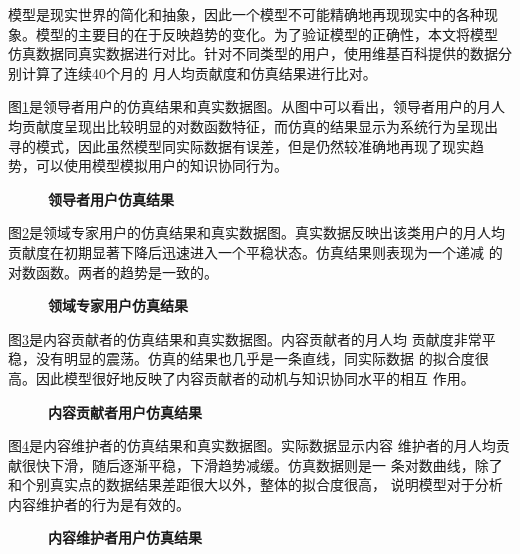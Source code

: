 模型是现实世界的简化和抽象，因此一个模型不可能精确地再现现实中的各种现
象。模型的主要目的在于反映趋势的变化。为了验证模型的正确性，本文将模型
仿真数据同真实数据进行对比。针对不同类型的用户，使用维基百科提供的数据分别计算了连续40个月的
月人均贡献度和仿真结果进行比对。

图\ref{fig:simu1}是领导者用户的仿真结果和真实数据图。从图中可以看出，领导者用户的月人
均贡献度呈现出比较明显的对数函数特征，而仿真的结果显示为系统行为呈现出
寻的模式，因此虽然模型同实际数据有误差，但是仍然较准确地再现了现实趋
势，可以使用模型模拟用户的知识协同行为。

\begin{figure}[!htb]
  \centering
 
 \caption{\small{\textbf{领导者用户仿真结果}}}
  \label{fig:simu1}
\end{figure}

图\ref{fig:simu2}是领域专家用户的仿真结果和真实数据图。真实数据反映出该类用户的月人均
贡献度在初期显著下降后迅速进入一个平稳状态。仿真结果则表现为一个递减
的对数函数。两者的趋势是一致的。

\begin{figure}[!htb]
  \centering
  
 \caption{\small{\textbf{领域专家用户仿真结果}}}
  \label{fig:simu2}
\end{figure}

图\ref{fig:simu3}是内容贡献者的仿真结果和真实数据图。内容贡献者的月人均
贡献度非常平稳，没有明显的震荡。仿真的结果也几乎是一条直线，同实际数据
的拟合度很高。因此模型很好地反映了内容贡献者的动机与知识协同水平的相互
作用。

\begin{figure}[!htb]
  \centering
  
  \caption{\small{\textbf{内容贡献者用户仿真结果}}}
  \label{fig:simu3}
\end{figure}

图\ref{fig:simu4}是内容维护者的仿真结果和真实数据图。实际数据显示内容
维护者的月人均贡献很快下滑，随后逐渐平稳，下滑趋势减缓。仿真数据则是一
条对数曲线，除了和个别真实点的数据结果差距很大以外，整体的拟合度很高，
说明模型对于分析内容维护者的行为是有效的。
\begin{figure}[!htb]
  \centering
    
  \caption{\small{\textbf{内容维护者用户仿真结果}}}
  \label{fig:simu4}
\end{figure}

